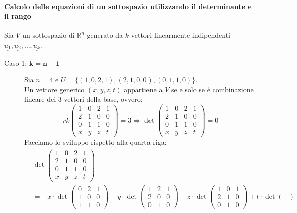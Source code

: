 \documentclass[a4paper]{article}
\theoremstyle{definition}
\begin{document}
\paragraph{Calcolo delle equazioni di un sottospazio utilizzando il determinante e il rango}
Sia $V$ un sottospazio di $\mathbb{R}^n$ generato da $k$ vettori linearmente indipendenti $\underline{u_1}, \underline{u_2}, \ldots, \underline{u_k}$.
\begin{description}
	\item[Caso 1: $\mathbf{k = n - 1}$] Sia $n = 4$ e $U = \{(1, 0, 2, 1), (2, 1, 0, 0), (0, 1, 1, 0)\}$. \\
	Un vettore generico $(x, y, z, t)$ appartiene a $V$ se e solo se è combinazione lineare dei 3 vettori della base, ovvero:
	\[rk\begin{pmatrix}
			1 & 0 & 2 & 1 \\
			2 & 1 & 0 & 0 \\
			0 & 1 & 1 & 0 \\
			x & y & z & t
		\end{pmatrix} = 3 \Rightarrow \det \begin{pmatrix}
			1 & 0 & 2 & 1 \\
			2 & 1 & 0 & 0 \\
			0 & 1 & 1 & 0 \\
			x & y & z & t
		\end{pmatrix} = 0\]
	Facciamo lo sviluppo rispetto alla quarta riga:
	\begin{align*}
		&\det \begin{pmatrix}
			1 & 0 & 2 & 1 \\
			2 & 1 & 0 & 0 \\
			0 & 1 & 1 & 0 \\
			x & y & z & t
		\end{pmatrix} \\
		&= - x \cdot \det \begin{pmatrix}
			0 & 2 & 1 \\
			1 & 0 & 0 \\
			1 & 1 & 0
		\end{pmatrix} + y \cdot \det \begin{pmatrix}
			1 & 2 & 1 \\
			2 & 0 & 0 \\
			0 & 1 & 0
		\end{pmatrix} - z \cdot \det \begin{pmatrix}
			1 & 0 & 1 \\
			2 & 1 & 0 \\
			0 & 1 & 0
		\end{pmatrix} + t \cdot \det \begin{pmatrix}

\end{pmatrix}
\end{align*}
\end{description}
\end{document}
